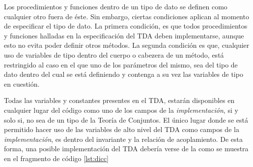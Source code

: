 Los procedimientos y funciones dentro de un tipo de dato se definen como
cualquier otro fuera de éste. Sin embargo, ciertas condiciones aplican al
momento de especificar el tipo de dato. La primera condición, es que todos
procedimientos y funciones halladas en la especificación del TDA deben
implementarse, aunque esto no evita poder definir otros métodos. La segunda
condición es que, cualquier uso de variables de tipo dentro del cuerpo o
cabezera de un método, está restringido al caso en el que uno de los
parámetros del mismo, sea del tipo de dato dentro del cual se está definiendo
y contenga a su vez las variables de tipo en cuestión.

Todas las variables y constantes presentes en el TDA, estarán disponibles en
cualquier lugar del código como uno de los campos de la
\textit{implementación}, si y solo si, no sea de un tipo de la Teoría de
Conjuntos. El único lugar donde se está permitido hacer uso de las variables
de alto nivel del TDA como campos de la \textit{implementación}, es dentro del
invariante y la relación de acoplamiento. De esta forma, una posible
implementación del TDA  debería verse de la como se muestra
en el fragmento de código \ref{lst:dicc}


